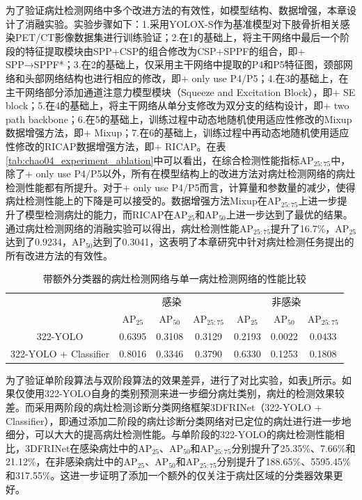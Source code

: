 为了验证病灶检测网络中多个改进方法的有效性，如模型结构、数据增强，本章设计了消融实验。实验步骤如下：1.采用YOLOX-S作为基准模型对下肢骨折相关感染PET/CT影像数据集进行训练验证；2.在1的基础上，将主干网络中最后一个阶段的特征提取模块由SPP+CSP的组合修改为CSP+SPPF的组合，即+ SPP→SPPF*；3.在2的基础上，仅采用主干网络中提取的P4和P5特征图，颈部网络和头部网络结构也进行相应的修改，即+ only use P4/P5；4.在3的基础上，在主干网络部分添加通道注意力模型模块（Squeeze and Excitation Block），即+ SE block；5.在4的基础上，将主干网络从单分支修改为双分支的结构设计，即+ two path backbone；6.在5的基础上，训练过程中动态地随机使用适应性修改的Mixup数据增强方法，即+ Mixup；7.在6的基础上，训练过程中再动态地随机使用适应性修改的RICAP数据增强方法，即+ RICAP。在表\ref{tab:chao04_experiment_ablation}中可以看出，在综合检测性能指标AP\(_{25:75}\)中，除了+ only use P4/P5以外，所有在模型结构上的改进方法对病灶检测网络的病灶检测性能都有所提升。对于+ only use P4/P5而言，计算量和参数量的减少，使得病灶检测性能上的下降是可以接受的。数据增强方法Mixup在AP\(_{25:75}\)上进一步提升了模型检测病灶的能力，而RICAP在AP\(_{25}\)和AP\(_{50}\)上进一步达到了最优的结果。通过病灶检测网络的消融实验可以得出，病灶检测性能AP\(_{25:75}\)提升了16.7\%，AP\(_{25}\)达到了0.9234，AP\(_{50}\)达到了0.3041，这表明了本章研究中针对病灶检测任务提出的所有改进方法的有效性。

\begin{table}[htbp]
    \centering
    \caption{带额外分类器的病灶检测网络与单一病灶检测网络的性能比较}
    \begin{tabular}{ccccccc}
        \toprule
                              & \multicolumn{3}{c}{感染} & \multicolumn{3}{c}{非感染}                                                               \\
                              & AP\(_{25}\)              & AP\(_{50}\)                & AP\(_{25:75}\) & AP\(_{25}\) & AP\(_{50}\) & AP\(_{25:75}\) \\
        \midrule
        322-YOLO              & 0.6395                   & 0.3108                     & 0.3129         & 0.2193      & 0.0022      & 0.0433         \\
        322-YOLO + Classifier & 0.8016                   & 0.3346                     & 0.3790         & 0.6330      & 0.1253      & 0.1808         \\
        \bottomrule
    \end{tabular}
    \label{tab:chao04_experiment_1vs2}
\end{table}

为了验证单阶段算法与双阶段算法的效果差异，进行了对比实验，如表\ref{tab:chao04_experiment_1vs2}所示。如果仅使用322-YOLO自身的类别预测来进一步细分病灶类别，病灶的检测效果较差。而采用两阶段的病灶检测诊断分类网络框架3DFRINet（322-YOLO + Classifier），即通过添加二阶段的病灶诊断分类网络对已定位的病灶进行进一步地细分，可以大大的提高病灶检测性能。与单阶段的322-YOLO的病灶检测性能相比，3DFRINet在感染病灶中的AP\(_{25}\)、AP\(_{50}\)和AP\(_{25:75}\)分别提升了25.35\%、7.66\%和21.12\%，在非感染病灶中的AP\(_{25}\)、AP\(_{50}\)和AP\(_{25:75}\)分别提升了188.65\%、5595.45\%和317.55\%。这进一步证明了添加一个额外的仅关注于病灶区域的分类器效果更好。


